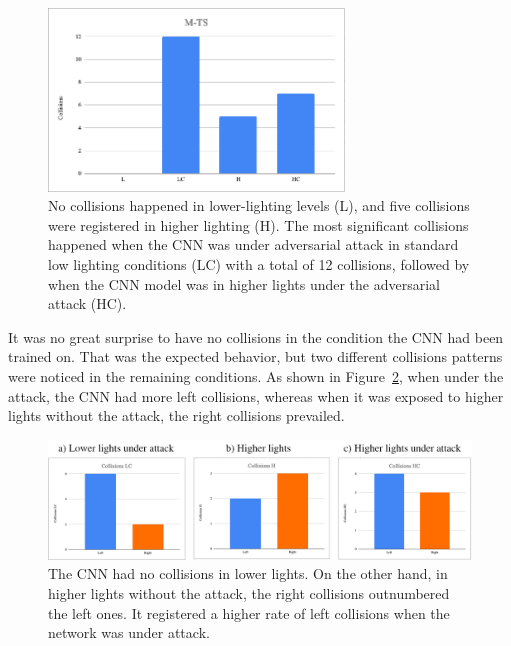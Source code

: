 \documentclass[12pt]{article}
\begin{document}
\begin{figure}[H]
\begin{center}
\includegraphics[width=0.7\textwidth]{figures/mts-collisions-total.png}
\caption{ No collisions happened in lower-lighting levels (L), and five collisions were registered in higher lighting (H). The most significant collisions happened when the CNN was under adversarial attack in standard low lighting conditions (LC) with a total of 12 collisions, followed by when the CNN model was in higher lights under the adversarial attack (HC). }
\label{fig:mtscollisions}
\end{center}
\end{figure}

It was no great surprise to have no collisions in the condition the CNN had been trained on. That was the expected behavior, but two different collisions patterns were noticed in the remaining conditions. As shown in Figure~\ref{fig:mtsleftright}, when under the attack, the CNN had more left collisions, whereas when it was exposed to higher lights without the attack, the right collisions prevailed. 

\begin{figure}[H]
\begin{center}
\includegraphics[width=1.0\textwidth]{figures/mtsleftrightcollisions.png}
\caption{ The CNN had no collisions in lower lights. On the other hand, in higher lights without the attack, the right collisions outnumbered the left ones. It registered a higher rate of left collisions when the network was under attack.}
\label{fig:mtsleftright}
\end{center}
\end{figure}
\end{document}
